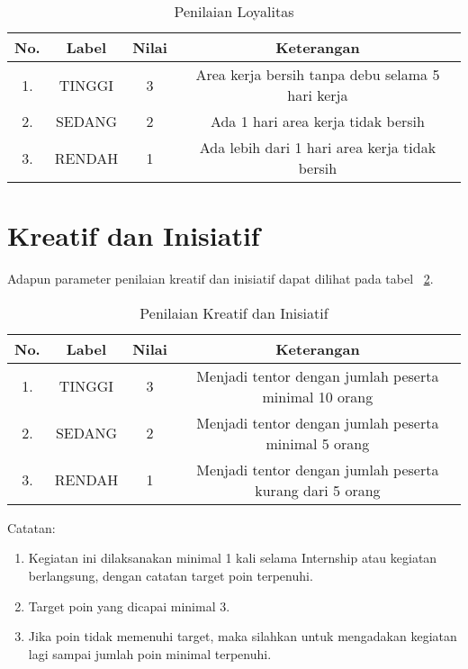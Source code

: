 \begin{table}[H]
\caption{Penilaian Loyalitas}
\centering
\begin{tabular}{|c|c|c|c|}
\hline
\textbf{No.}&\textbf{Label}&\textbf{Nilai}&\textbf{Keterangan}\\
\hline
1.&TINGGI&3&Area kerja bersih tanpa debu selama 5 hari kerja\\
\hline
2.&SEDANG&2&Ada 1 hari area kerja tidak bersih\\
\hline
3.&RENDAH&1&Ada lebih dari 1 hari area kerja tidak bersih\\
\hline
\end{tabular}
\label{table:nilailoyalitas}
\end{table}

\section{Kreatif dan Inisiatif}

Adapun parameter penilaian kreatif dan inisiatif dapat dilihat pada tabel ~\ref{table:nilaikreatifinisiatif}.

\begin{table}[H]
\caption{Penilaian Kreatif dan Inisiatif}
\centering
\begin{tabular}{|c|c|c|c|}
\hline
\textbf{No.}&\textbf{Label}&\textbf{Nilai}&\textbf{Keterangan}\\
\hline
1.&TINGGI&3&Menjadi tentor dengan jumlah peserta minimal 10 orang\\
\hline
2.&SEDANG&2&Menjadi tentor dengan jumlah peserta minimal 5 orang\\
\hline
3.&RENDAH&1&Menjadi tentor dengan jumlah peserta kurang dari 5 orang\\
\hline
\end{tabular}
\label{table:nilaikreatifinisiatif}
\end{table}

Catatan:
\begin{enumerate}
\item Kegiatan ini dilaksanakan minimal 1 kali selama Internship atau kegiatan berlangsung, dengan catatan target poin terpenuhi.
\item Target poin yang dicapai minimal 3.
\item Jika poin tidak memenuhi target, maka silahkan untuk mengadakan kegiatan lagi sampai jumlah poin minimal terpenuhi.
\end{enumerate} 